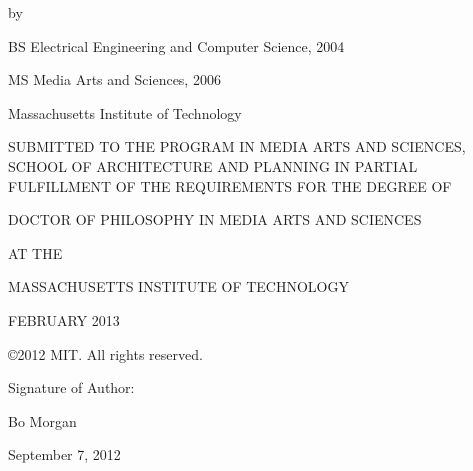 \thispagestyle{empty}

\begin{addmargin}[1cm]{-2cm}
\begin{center}
    \begingroup
        \color{Maroon}\spacedallcaps{\myTitle}
    \endgroup

    \vspace{2mm}

    by

    \vspace{2mm}

    \myName

    \vspace{6mm}
    
    BS Electrical Engineering and Computer Science, 2004
    
    MS Media Arts and Sciences, 2006

    Massachusetts Institute of Technology
    
    \vspace{6mm}

 SUBMITTED TO THE PROGRAM IN MEDIA ARTS AND SCIENCES, SCHOOL OF
 ARCHITECTURE AND PLANNING IN PARTIAL FULFILLMENT OF THE REQUIREMENTS
 FOR THE DEGREE OF

    \vspace{6mm}

DOCTOR OF PHILOSOPHY IN MEDIA ARTS AND SCIENCES

AT THE

MASSACHUSETTS INSTITUTE OF TECHNOLOGY

    \vspace{6mm}

FEBRUARY 2013

    \vspace{6mm}

\copyright 2012 MIT.  All rights reserved.

\end{center}        


\begin{flushright}
  \vspace{15mm}

  Signature of Author:\hspace{0.5cm}~\makebox[2.75in]{\hrulefill}

Bo Morgan

September 7, 2012
                          
  \vspace{15mm}
  

\end{flushright}
\end{addmargin}
